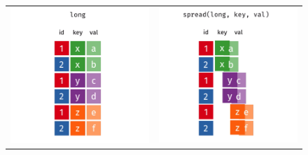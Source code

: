 \begin{figure}[H]
    \begin{tabular}{cc}
     \includegraphics[scale = 0.25]{Masters-Thesis/img/tidyel2ws1.png} & \includegraphics[scale = 0.25]{Masters-Thesis/img/tidyel2ws2.png} \\

\end{tabular}
\end{figure}
